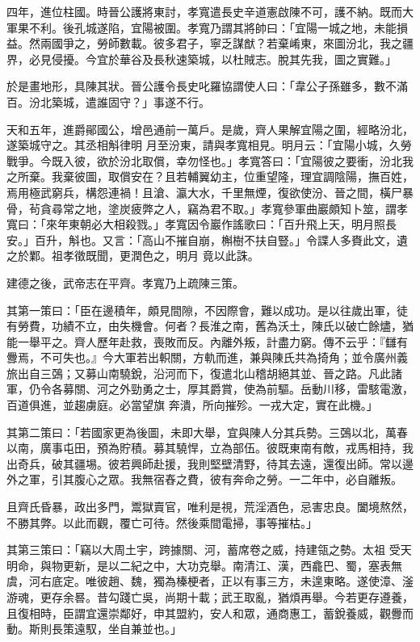 \begin{pinyinscope}
 四年，進位柱國。時晉公護將東討，孝寬遣長史辛道憲啟陳不可，護不納。既而大軍果不利。後孔城遂陷，宜陽被圍。孝寬乃謂其將帥曰：「宜陽一城之地，未能損益。然兩國爭之，勞師數載。彼多君子，寧乏謀猷？若棄崤東，來圖汾北，我之疆界，必見侵擾。今宜於華谷及長秋速築城，以杜賊志。脫其先我，圖之實難。」



 於是畫地形，具陳其狀。晉公護令長史叱羅協謂使人曰：「韋公子孫雖多，數不滿百。汾北築城，遣誰固守？」事遂不行。



 天和五年，進爵鄖國公，增邑通前一萬戶。是歲，齊人果解宜陽之圍，經略汾北，遂築城守之。其丞相斛律明
 月至汾東，請與孝寬相見。明月云：「宜陽小城，久勞戰爭。今既入彼，欲於汾北取償，幸勿怪也。」孝寬答曰：「宜陽彼之要衝，汾北我之所棄。我棄彼圖，取償安在？且若輔翼幼主，位重望隆，理宜調陰陽，撫百姓，焉用極武窮兵，構怨連禍！且滄、瀛大水，千里無煙，復欲使汾、晉之間，橫尸暴骨，茍貪尋常之地，塗炭疲弊之人，竊為君不取。」孝寬參軍曲巖頗知卜筮，謂孝寬曰：「來年東朝必大相殺戮。」孝寬因令巖作謠歌曰：「百升飛上天，明月照長安。」百升，斛也。又言：「高山不摧自崩，槲樹不扶自豎。」令諜人多賚此文，遺之於鄴。祖孝徵既聞，更潤色之，明月
 竟以此誅。



 建德之後，武帝志在平齊。孝寬乃上疏陳三策。



 其第一策曰：「臣在邊積年，頗見間隙，不因際會，難以成功。是以往歲出軍，徒有勞費，功績不立，由失機會。何者？長淮之南，舊為沃土，陳氏以破亡餘燼，猶能一舉平之。齊人歷年赴救，喪敗而反。內離外叛，計盡力窮。傳不云乎：『讎有釁焉，不可失也。』今大軍若出軹關，方軌而進，兼與陳氏共為掎角；並令廣州義旅出自三鵶；又募山南驍銳，沿河而下，復遣北山稽胡絕其並、晉之路。凡此諸軍，仍令各募關、河之外勁勇之士，厚其爵賞，使為前驅。岳動川移，雷駭電激，百道俱進，並趨虜庭。必當望旗
 奔潰，所向摧殄。一戎大定，實在此機。」



 其第二策曰：「若國家更為後圖，未即大舉，宜與陳人分其兵勢。三鵶以北，萬春以南，廣事屯田，預為貯積。募其驍悍，立為部伍。彼既東南有敵，戎馬相持，我出奇兵，破其疆埸。彼若興師赴援，我則堅壁清野，待其去遠，還復出師。常以邊外之軍，引其腹心之眾。我無宿舂之費，彼有奔命之勞。一二年中，必自離叛。



 且齊氏昏暴，政出多門，鬻獄賣官，唯利是視，荒淫酒色，忌害忠良。闔境熬然，不勝其弊。以此而觀，覆亡可待。然後乘間電掃，事等摧枯。」



 其第三策曰：「竊以大周土宇，跨據關、河，蓄席卷之威，持建瓴之勢。太祖
 受天明命，與物更新，是以二紀之中，大功克舉。南清江、漢，西龕巴、蜀，塞表無虞，河右底定。唯彼趙、魏，獨為榛梗者，正以有事三方，未遑東略。遂使漳、滏游魂，更存余晷。昔勾踐亡吳，尚期十載；武王取亂，猶煩再舉。今若更存遵養，且復相時，臣謂宜還崇鄰好，申其盟約，安人和眾，通商惠工，蓄銳養威，觀釁而動。斯則長策遠馭，坐自兼並也。」




\end{pinyinscope}
